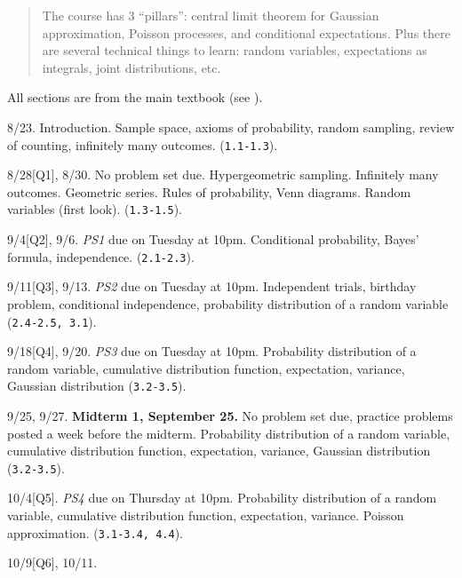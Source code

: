 \documentclass[oneside,11pt]{amsart}
\begin{document}
\bigskip

\begin{quote}
	The course has 3 ``pillars'': central limit theorem for Gaussian approximation, 
	Poisson processes, and conditional expectations. 
	Plus there are several technical things to learn: random variables, expectations as integrals, 
	joint distributions, etc.
\end{quote}

\bigskip

All sections are from the main textbook (see ).

\medskip

\begin{enumerate}[\bf{}{[}week 1{]}]
	\item 8/23.
		Introduction. Sample space, axioms of probability, random sampling, review of counting,
		infinitely many outcomes.
		(\texttt{1.1-1.3}).
	\item 8/28[Q1], 8/30.
		No problem set due.
		Hypergeometric sampling. Infinitely many outcomes. Geometric series. 
		Rules of probability, Venn diagrams. Random variables (first look). 
		(\texttt{1.3-1.5}).
	\item 9/4[Q2], 9/6.
		\emph{PS1} due on Tuesday at 10pm.
		Conditional probability, Bayes' formula, independence.
		(\texttt{2.1-2.3}).
	\item 9/11[Q3], 9/13.
		\emph{PS2} due on Tuesday at 10pm.
		Independent trials, birthday problem, conditional independence, 
		probability distribution of a random variable
		(\texttt{2.4-2.5, 3.1}).
	\item 9/18[Q4], 9/20.
		\emph{PS3} due on Tuesday at 10pm.
		Probability distribution of a random variable,
		cumulative distribution function, expectation, variance, Gaussian distribution (\texttt{3.2-3.5}).
	\item 9/25, 9/27. \textbf{Midterm 1, September 25.}
		No problem set due, practice problems posted a week before the midterm.
		Probability distribution of a random variable,
		cumulative distribution function, expectation, variance, Gaussian distribution (\texttt{3.2-3.5}).
	\item 10/4[Q5].
		\emph{PS4} due on Thursday at 10pm.
		Probability distribution of a random variable,
		cumulative distribution function, expectation, variance. Poisson approximation.
		(\texttt{3.1-3.4, 4.4}).
	\item 10/9[Q6], 10/11.

\end{enumerate}
\end{document}
